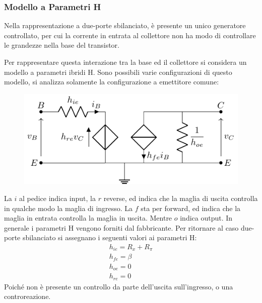 \documentclass{article}
\numberwithin{equation}{subsection}
\begin{document}
\subsubsection{Modello a Parametri H}

Nella rappresentazione a due-porte sbilanciato, è presente un unico generatore controllato, per cui la corrente in entrata al collettore non ha modo di 
controllare le grandezze nella base del transistor. 

Per rappresentare questa interazione tra la base ed il collettore si considera un modello a parametri ibridi H. 
Sono possibili varie configurazioni di questo modello, si analizza solamente la configurazione a emettitore comune:
\begin{figure}[H]%
    \centering
    \includegraphics{bjt-parametri-h.pdf}%
    \label{fig:bjt-parametri-h}
\end{figure}
La $i$ al pedice indica input, la $r$ reverse, ed indica che la maglia di uscita controlla in qualche modo la maglia di ingresso. La $f$ sta 
per forward, ed indica che la maglia in entrata controlla la maglia in uscita. Mentre $o$ indica output. 
In generale i parametri H vengono forniti dal fabbricante. 
Per ritornare al caso due-porte sbilanciato si assegnano i seguenti valori ai parametri H:
\begin{gather*}
    h_{ie}=R_x+R_{\pi}\\
    h_{fe}=\beta\\
    h_{oe}=0\\
    h_{re}=0
\end{gather*}
Poiché non è presente un controllo da parte dell'uscita sull'ingresso, o una controreazione. 
\end{document}

